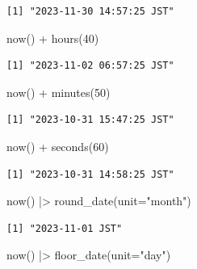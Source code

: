 \documentclass[
  letterpaper,
  DIV=11,
  numbers=noendperiod]{scrreprt}
\newenvironment{Shaded}{\begin{snugshade}}{\end{snugshade}}
\newcommand{\AttributeTok}[1]{\textcolor[rgb]{0.40,0.45,0.13}{#1}}
\newcommand{\DecValTok}[1]{\textcolor[rgb]{0.68,0.00,0.00}{#1}}
\newcommand{\FunctionTok}[1]{\textcolor[rgb]{0.28,0.35,0.67}{#1}}
\newcommand{\NormalTok}[1]{\textcolor[rgb]{0.00,0.23,0.31}{#1}}
\newcommand{\SpecialCharTok}[1]{\textcolor[rgb]{0.37,0.37,0.37}{#1}}
\newcommand{\StringTok}[1]{\textcolor[rgb]{0.13,0.47,0.30}{#1}}
\begin{document}
\begin{verbatim}
[1] "2023-11-30 14:57:25 JST"
\end{verbatim}

\begin{Shaded}
\begin{Highlighting}[]
\FunctionTok{now}\NormalTok{() }\SpecialCharTok{+} \FunctionTok{hours}\NormalTok{(}\DecValTok{40}\NormalTok{)}
\end{Highlighting}
\end{Shaded}

\begin{verbatim}
[1] "2023-11-02 06:57:25 JST"
\end{verbatim}

\begin{Shaded}
\begin{Highlighting}[]
\FunctionTok{now}\NormalTok{() }\SpecialCharTok{+} \FunctionTok{minutes}\NormalTok{(}\DecValTok{50}\NormalTok{)}
\end{Highlighting}
\end{Shaded}

\begin{verbatim}
[1] "2023-10-31 15:47:25 JST"
\end{verbatim}

\begin{Shaded}
\begin{Highlighting}[]
\FunctionTok{now}\NormalTok{() }\SpecialCharTok{+} \FunctionTok{seconds}\NormalTok{(}\DecValTok{60}\NormalTok{)}
\end{Highlighting}
\end{Shaded}

\begin{verbatim}
[1] "2023-10-31 14:58:25 JST"
\end{verbatim}

\begin{Shaded}
\begin{Highlighting}[]
\FunctionTok{now}\NormalTok{() }\SpecialCharTok{|\textgreater{}} \FunctionTok{round\_date}\NormalTok{(}\AttributeTok{unit=}\StringTok{"month"}\NormalTok{)}
\end{Highlighting}
\end{Shaded}

\begin{verbatim}
[1] "2023-11-01 JST"
\end{verbatim}

\begin{Shaded}
\begin{Highlighting}[]
\FunctionTok{now}\NormalTok{() }\SpecialCharTok{|\textgreater{}} \FunctionTok{floor\_date}\NormalTok{(}\AttributeTok{unit=}\StringTok{"day"}\NormalTok{)}
\end{Highlighting}
\end{Shaded}
\end{document}

